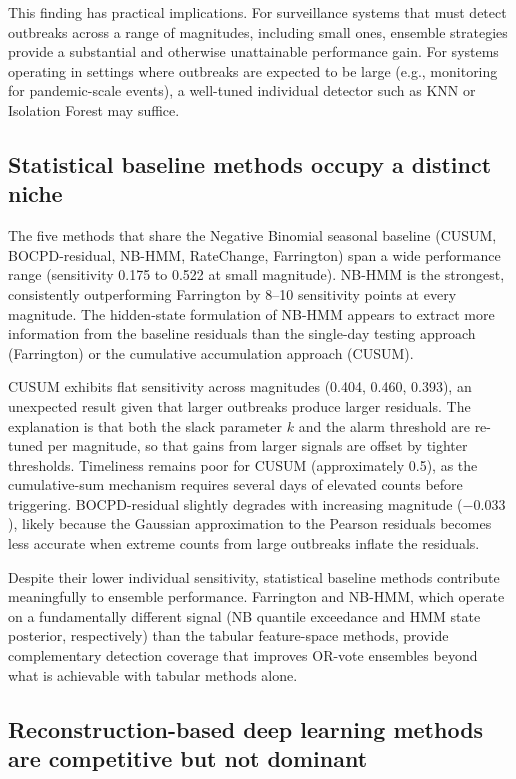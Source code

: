 \documentclass[11pt]{article}
\begin{document}
This finding has practical implications. For surveillance systems that must detect outbreaks across a range of magnitudes, including small ones, ensemble strategies provide a substantial and otherwise unattainable performance gain. For systems operating in settings where outbreaks are expected to be large (e.g., monitoring for pandemic-scale events), a well-tuned individual detector such as KNN or Isolation Forest may suffice.

\subsection{Statistical baseline methods occupy a distinct niche}

The five methods that share the Negative Binomial seasonal baseline (CUSUM, BOCPD-residual, NB-HMM, RateChange, Farrington) span a wide performance range (sensitivity 0.175 to 0.522 at small magnitude). NB-HMM is the strongest, consistently outperforming Farrington by 8--10 sensitivity points at every magnitude. The hidden-state formulation of NB-HMM appears to extract more information from the baseline residuals than the single-day testing approach (Farrington) or the cumulative accumulation approach (CUSUM).

CUSUM exhibits flat sensitivity across magnitudes (0.404, 0.460, 0.393), an unexpected result given that larger outbreaks produce larger residuals. The explanation is that both the slack parameter $k$ and the alarm threshold are re-tuned per magnitude, so that gains from larger signals are offset by tighter thresholds. Timeliness remains poor for CUSUM (approximately 0.5), as the cumulative-sum mechanism requires several days of elevated counts before triggering. BOCPD-residual slightly degrades with increasing magnitude ($-0.033$), likely because the Gaussian approximation to the Pearson residuals becomes less accurate when extreme counts from large outbreaks inflate the residuals.

Despite their lower individual sensitivity, statistical baseline methods contribute meaningfully to ensemble performance. Farrington and NB-HMM, which operate on a fundamentally different signal (NB quantile exceedance and HMM state posterior, respectively) than the tabular feature-space methods, provide complementary detection coverage that improves OR-vote ensembles beyond what is achievable with tabular methods alone.

\subsection{Reconstruction-based deep learning methods are competitive but not dominant}
\end{document}
